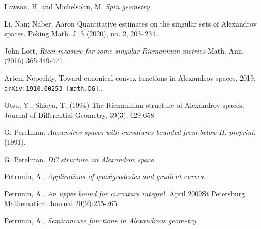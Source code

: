 \begin{thebibliography}{52}
Lawson, H. and Michelsohn, M.
\textit{Spin geometry}

Li, Nan; Naber, Aaron
Quantitative estimates on the singular sets of Alexandrov spaces. 
Peking Math. J. 3 (2020), no. 2, 203--234.

 John Lott,\textit{
Ricci measure for some singular Riemannian metrics}
Math. Ann. (2016) 365:449-471.

 Artem Nepechiy,
Toward canonical convex functions in Alexandrov spaces, 
2019,
\texttt{arXiv:1910.00253 [math.DG]},.

   Otsu, Y.,  Shioya, T. (1994)
The Riemannian structure of Alexandrov spaces. Journal of Differential Geometry, 39(3), 629-658

 G. Perelman. \textit{Alexandrov spaces with curvatures bounded from below II. preprint}, (1991).

 G. Perelman. \textit{DC structure on Alexandrov space}

 Petrunin, A., \textit{Applications of quasigeodesics
and gradient curves.}

 Petrunin, A., \textit{An upper bound for curvature integral.} April 2009St Petersburg Mathematical Journal 20(2):255-265

 Petrunin, A., \textit{Semiconcave functions in Alexandrovs geometry}

\end{thebibliography}
